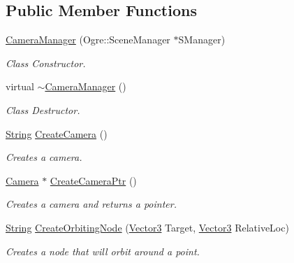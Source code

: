 \subsection*{Public Member Functions}
\begin{DoxyCompactItemize}
\item 
\hyperlink{classphys_1_1CameraManager_aff47d21e0c80b2b1b44148b0ec7de344}{CameraManager} (Ogre::SceneManager $\ast$SManager)
\begin{DoxyCompactList}\small\item\em Class Constructor. \item\end{DoxyCompactList}\item 
virtual \hyperlink{classphys_1_1CameraManager_a0b0f032477309eb47b0302fd5eef198c}{$\sim$CameraManager} ()
\begin{DoxyCompactList}\small\item\em Class Destructor. \item\end{DoxyCompactList}\item 
\hyperlink{namespacephys_aa03900411993de7fbfec4789bc1d392e}{String} \hyperlink{classphys_1_1CameraManager_ac6ff80c91fa5a2cd21ebd8b78db9add2}{CreateCamera} ()
\begin{DoxyCompactList}\small\item\em Creates a camera. \item\end{DoxyCompactList}\item 
\hyperlink{classphys_1_1Camera}{Camera} $\ast$ \hyperlink{classphys_1_1CameraManager_ae51f79b63b5c34959bc4cfbef34b8f08}{CreateCameraPtr} ()
\begin{DoxyCompactList}\small\item\em Creates a camera and returns a pointer. \item\end{DoxyCompactList}\item 
\hyperlink{namespacephys_aa03900411993de7fbfec4789bc1d392e}{String} \hyperlink{classphys_1_1CameraManager_a9a696ea09f174a69bbc6d0bb179b3de4}{CreateOrbitingNode} (\hyperlink{classphys_1_1Vector3}{Vector3} Target, \hyperlink{classphys_1_1Vector3}{Vector3} RelativeLoc)
\begin{DoxyCompactList}\small\item\em Creates a node that will orbit around a point. \item\end{DoxyCompactList}\item 

\end{DoxyCompactItemize}
